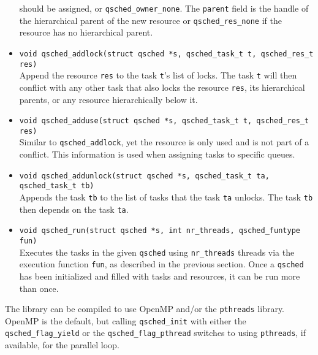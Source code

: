 \documentclass[preprint]{elsarticle}
\begin{document}
\begin{itemize}
        should be assigned, or {\tt qsched\_owner\_none}.
        The {\tt parent} field is the handle of the hierarchical parent of
        the new resource or {\tt qsched\_res\_none} if the resource
        has no hierarchical parent.
        \vspace{1mm}
    \item {\tt void qsched\_addlock(struct qsched *s, qsched\_task\_t t, qsched\_res\_t res)} \\
        Append the resource {\tt res} to the task {\tt t}'s list of
        locks.
        The task {\tt t} will then conflict with any other task that
        also locks the resource {\tt res}, its hierarchical parents, or
        any resource hierarchically below it.
        \vspace{1mm}
    \item {\tt void qsched\_adduse(struct qsched *s, qsched\_task\_t t, qsched\_res\_t res)} \\
        Similar to {\tt qsched\_addlock}, yet the resource is only used and
        is not part of a conflict.
        This information is used when assigning tasks to specific queues.
        \vspace{1mm}
    \item {\tt void qsched\_addunlock(struct qsched *s, qsched\_task\_t ta, qsched\_task\_t tb)} \\
        Appends the task {\tt tb} to the list of tasks that the task {\tt ta}
        unlocks.
        The task {\tt tb} then depends on the task {\tt ta}.
        \vspace{1mm}
    \item {\tt void qsched\_run(struct qsched *s, int nr\_threads, qsched\_funtype fun)} \\
        Executes the tasks in the given {\tt qsched} using {\tt nr\_threads}
        threads via the execution function {\tt fun}, as described in the
        previous section.
        Once a {\tt qsched} has been initialized and filled with
        tasks and resources, it can be run more than once.
        \vspace{1mm}
\end{itemize}

The library can be compiled to use OpenMP and/or the
{\tt pthreads} library.
OpenMP is the default, but calling {\tt qsched\_init} with
either the {\tt qsched\_flag\_yield}
or the {\tt qsched\_flag\_pthread} switches to using {\tt pthreads},
if available, for the parallel loop.
\end{document}
